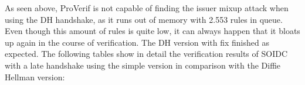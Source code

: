 \documentclass[11pt,twoside,a4paper,openright]{book}
\begin{document}
    \begin{table}[H]
        \centering
        \def\arraystretch{1.5}
    \end{table}

As seen above, ProVerif is not capable of finding the issuer mixup attack when using the DH handshake, as it runs out of memory with 2.553 rules in queue. Even though this amount of rules is quite low, it can always happen that it bloats up again in the course of verification. The DH version with fix finished as expected. The following tables show in detail the verification results of SOIDC with a late handshake using the simple version in comparison with the Diffie Hellman version:

    \begin{table}[H]
        \centering
        \def\arraystretch{1.5}
    \end{table}
\end{document}
